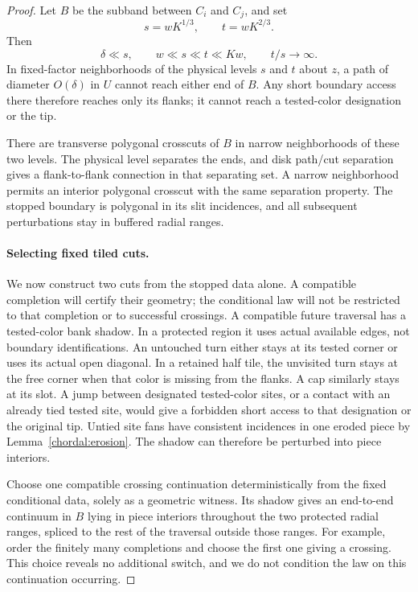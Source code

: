 \begin{proof}
Let $B$ be the subband between $C_i$ and $C_j$, and set
\[
 s=wK^{1/3},\qquad t=wK^{2/3}.
\]
Then
\[
 \delta\ll s,\qquad w\ll s\ll t\ll Kw,
 \qquad t/s\longrightarrow\infty.
\]
In fixed-factor neighborhoods of the physical levels $s$ and $t$
about $z$, a path of diameter $O(\delta)$ in $U$ cannot reach
either end of $B$.  Any short boundary access there therefore
reaches only its flanks; it cannot reach a tested-color designation
or the tip.

There are transverse polygonal crosscuts of $B$ in narrow
neighborhoods of these two levels.  The physical level separates
the ends, and disk path/cut separation gives a flank-to-flank
connection in that separating set.  A narrow neighborhood permits
an interior polygonal crosscut with the same separation property.
The stopped boundary is polygonal in its slit incidences, and
all subsequent perturbations stay in buffered radial ranges.

\paragraph{Selecting fixed tiled cuts.}
We now construct two cuts from the stopped data alone.  A compatible
completion will certify their geometry; the conditional law will not
be restricted to that completion or to successful crossings.
A compatible future traversal has a tested-color bank shadow.
In a protected region it uses actual available edges, not boundary
identifications.  An untouched turn either stays at its tested
corner or uses its actual open diagonal.  In a retained half tile,
the unvisited turn stays at the free corner when that color is
missing from the flanks.  A cap similarly stays at its slot.
A jump between designated tested-color sites, or a contact with
an already tied tested site, would give a forbidden short access
to that designation or the original tip.  Untied site fans have
consistent incidences in one eroded piece by
Lemma~\ref{chordal:erosion}.  The shadow can therefore be perturbed
into piece interiors.

Choose one compatible crossing continuation deterministically from
the fixed conditional data, solely as a geometric witness.  Its
shadow gives an end-to-end continuum in $B$ lying in piece interiors
throughout the two protected radial ranges, spliced to the rest of
the traversal outside those ranges.  For example, order the finitely
many completions and choose the first one giving a crossing.
This choice reveals no additional switch, and we do not condition
the law on this continuation occurring.


\end{proof}
